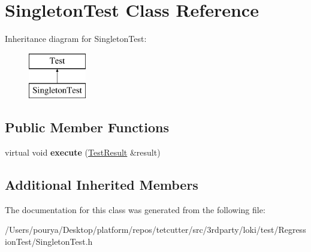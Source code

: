 \hypertarget{classSingletonTest}{}\section{Singleton\+Test Class Reference}
\label{classSingletonTest}
Inheritance diagram for Singleton\+Test\+:\begin{figure}[H]
\begin{center}
\leavevmode
\includegraphics[height=2.000000cm]{classSingletonTest}
\end{center}
\end{figure}
\subsection*{Public Member Functions}
\begin{DoxyCompactItemize}
\item 
\hypertarget{classSingletonTest_a06d8a8e374c307df31f39763067b4aef}{}virtual void {\bfseries execute} (\hyperlink{classTestResult}{Test\+Result} \&result)\label{classSingletonTest_a06d8a8e374c307df31f39763067b4aef}

\end{DoxyCompactItemize}
\subsection*{Additional Inherited Members}


The documentation for this class was generated from the following file\+:\begin{DoxyCompactItemize}
\item 
/\+Users/pourya/\+Desktop/platform/repos/tetcutter/src/3rdparty/loki/test/\+Regression\+Test/Singleton\+Test.\+h\end{DoxyCompactItemize}
